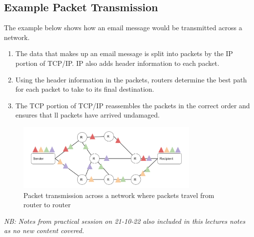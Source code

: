 \subsection*{Example Packet Transmission}
The example below shows how an email message would be transmitted across a network. 
\begin{enumerate}
    \item The data that makes up an email message is split into packets by the IP portion of TCP/IP. IP also adds header information to each packet.
    \item Using the header information in the packets, routers determine the best path for each packet to take to its final destination.
    \item The TCP portion of TCP/IP reassembles the packets in the correct order and ensures that ll packets have arrived undamaged.
\end{enumerate}
\begin{figure}[H]
    \centering
    \includegraphics*[width=0.8\textwidth]{assets/packet-transmission.png}
    \caption{Packet transmission across a network where packets travel from router to router}
\end{figure}
\textit{NB: Notes from practical session on 21-10-22 also included in this lectures notes as no new content covered.}